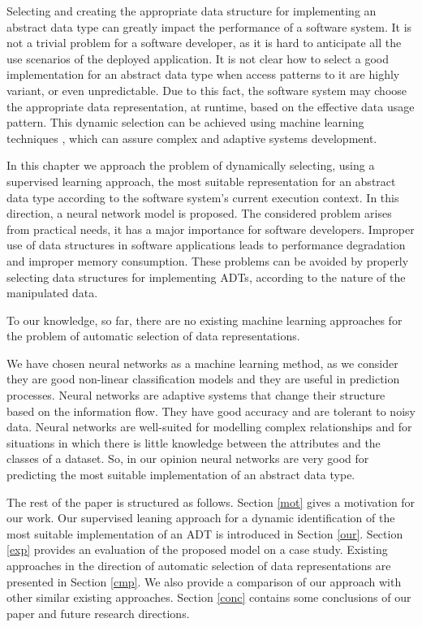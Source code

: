 Selecting and creating the appropriate data structure for implementing an abstract data type can greatly impact the performance of a software system.
It is not a trivial problem for a software developer, as it is hard to anticipate all the use scenarios of the deployed application. It is not clear how to select a good implementation
for an abstract data type when access patterns to it are
highly variant, or even unpredictable. Due to this fact, the software system may choose the appropriate data representation, at runtime, based on the effective data usage pattern. This dynamic selection can be achieved using machine learning techniques \cite{mitchell}, which can assure complex and adaptive systems development.

In this chapter we approach the problem of dynamically selecting, using a supervised learning approach, the most suitable representation for an abstract data type according to the software system's current execution context. In this direction, a neural network model is proposed. The considered problem arises from practical needs, it has a major importance for software developers. Improper use of data structures in software applications leads to performance degradation and improper memory consumption. These problems can be avoided by properly selecting data structures for implementing ADTs, according to the nature of the manipulated data.

To our knowledge, so far, there are no existing machine learning approaches for the problem of automatic selection of data representations.





We have chosen neural networks as a machine learning method, as we consider they are good non-linear classification models and they are useful in prediction processes. Neural networks are adaptive systems that change their structure based on the information flow. They have good accuracy and are tolerant to noisy data. Neural networks are well-suited for modelling complex relationships and for situations in which there is little knowledge between the attributes and the classes of a dataset. So, in our opinion neural networks are very good for predicting the most suitable implementation of an abstract data type.

The rest of the paper is structured as follows. Section \ref{mot} gives a motivation for our work.  Our supervised leaning approach for a dynamic identification of the most suitable implementation of an ADT is introduced in Section \ref{our}. Section \ref{exp} provides an  evaluation of the proposed model on a case study. Existing approaches in the direction of automatic selection of data representations are presented in Section \ref{cmp}. We also provide a comparison of our approach with other
similar existing approaches. Section
\ref{conc} contains some conclusions of our paper and future
research directions.




